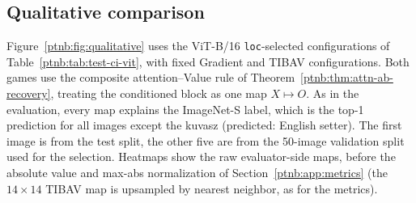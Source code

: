 \begin{table}[tbp]
    \centering
    \caption[Pointing game: Quantus tie rule and matched granularity]{Pointing game under the Quantus tie rule (PG, as in the main tables) and at matched
    granularity, ImageNet-S test split. max.\ set: median number of pixels attaining the map maximum;
    PG$_{1\mathrm{px}}$: expected hit rate of one pixel drawn uniformly from that set;
    PG$_{16\mathrm{px}}$: PG after average-pooling the map to $16{\times}16$-pixel cells. Rows: the
    \texttt{loc}-selected or fixed configuration of every method, plus the \texttt{faith} rows of our
    games. \textbf{Bold}: best per model and column.}
    \label{ptnb:tab:pg-granularity}
%
\end{table}

\subsection{Qualitative comparison}\label{ptnb:app:qualitative}\label{app:qualitative}
Figure~\ref{ptnb:fig:qualitative} uses the ViT-B/16 \texttt{loc}-selected configurations of Table~\ref{ptnb:tab:test-ci-vit}, with fixed Gradient and TIBAV configurations. Both games use the composite attention--Value rule of Theorem~\ref{ptnb:thm:attn-ab-recovery}, treating the conditioned block as one map $X\mapsto O$. As in the evaluation, every map explains the ImageNet-S label, which is the top-1 prediction for all images except the kuvasz (predicted: English setter). The first image is from the test split, the other five are from the 50-image validation split used for the selection. Heatmaps show the raw evaluator-side maps, before the absolute value and max-abs normalization of Section~\ref{ptnb:app:metrics} (the $14{\times}14$ TIBAV map is upsampled by nearest neighbor, as for the metrics).

